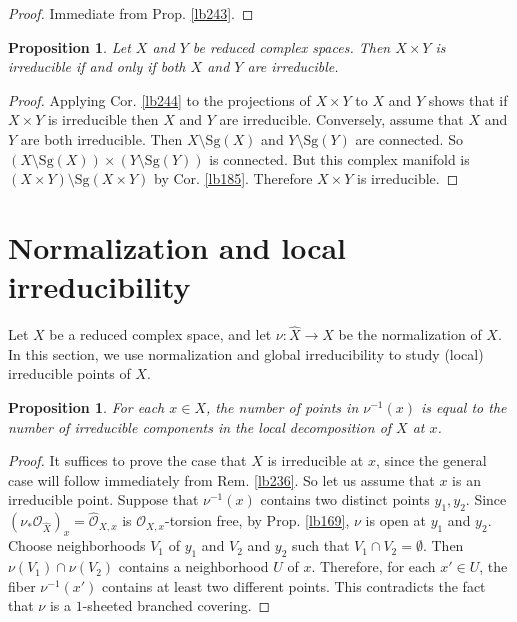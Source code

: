 \documentclass[12pt,b5paper,notitlepage]{report}
\theoremstyle{definition}
\theoremstyle{plain}
\newtheorem{pp}[df]{Proposition}
\newcommand{\wht}{\widehat}
\newcommand{\scr}{\mathscr}
\newcommand{\Sg}{\mathrm{Sg}}
\newcommand{\Owht}{\widehat{\scr O}}
\numberwithin{equation}{section}
\begin{document}
\begin{proof}
Immediate from Prop. \ref{lb243}.
\end{proof}


\begin{pp}\label{lb249}
Let $X$ and $Y$ be reduced complex spaces. Then $X\times Y$ is irreducible if and only if both $X$ and $Y$ are irreducible.
\end{pp}


\begin{proof}
Applying Cor. \ref{lb244} to the projections of $X\times Y$ to $X$ and $Y$ shows that if $X\times Y$ is irreducible then $X$ and $Y$ are irreducible. Conversely, assume that $X$ and $Y$ are both irreducible. Then $X\setminus\Sg(X)$ and $Y\setminus\Sg(Y)$ are connected. So $(X\setminus \Sg(X))\times (Y\setminus \Sg(Y))$ is connected. But this complex manifold is $(X\times Y)\setminus\Sg(X\times Y)$ by Cor. \ref{lb185}. Therefore $X\times Y$ is irreducible.
\end{proof}




\section{Normalization and local irreducibility}



Let $X$ be a reduced complex space, and let $\nu:\wht X\rightarrow X$ be the normalization of $X$. In this section, we use normalization and global irreducibility to study (local) irreducible points of $X$.

\begin{pp}\label{lb246}
For each $x\in X$, the number of points in $\nu^{-1}(x)$ is equal to the number of irreducible components in the local decomposition of $X$ at $x$.
\end{pp}


\begin{proof}
It suffices to prove the case that $X$ is irreducible at $x$, since the general case will follow immediately from Rem. \ref{lb236}. So let us assume that $x$ is an irreducible point. Suppose that $\nu^{-1}(x)$ contains two distinct points $y_1,y_2$. Since $(\nu_*\scr O_{\wht X})_x=\Owht_{X,x}$ is $\scr O_{X,x}$-torsion free, by Prop. \ref{lb169}, $\nu$ is open at $y_1$ and $y_2$. Choose neighborhoods $V_1$ of $y_1$ and $V_2$ and $y_2$ such that $V_1\cap V_2=\emptyset$. Then $\nu(V_1)\cap\nu(V_2)$ contains a neighborhood $U$ of $x$. Therefore, for each $x'\in U$, the fiber $\nu^{-1}(x')$ contains at least two different points. This contradicts the fact that $\nu$ is a $1$-sheeted branched covering.
\end{proof}
\end{document}
